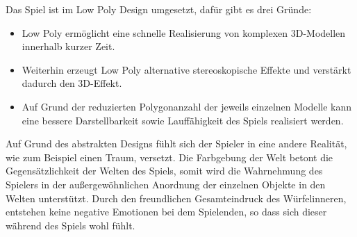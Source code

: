 
Das Spiel ist im Low Poly Design umgesetzt, dafür gibt es drei Gründe:
\begin{itemize}
\item Low Poly ermöglicht eine schnelle Realisierung von komplexen 3D-Modellen innerhalb kurzer Zeit.
\item Weiterhin erzeugt Low Poly alternative stereoskopische Effekte und verstärkt dadurch den 3D-Effekt.
\item Auf Grund der reduzierten Polygonanzahl der jeweils einzelnen Modelle kann eine bessere Darstellbarkeit sowie Lauffähigkeit des Spiels realisiert werden.
\end{itemize}

Auf Grund des abstrakten Designs fühlt sich der Spieler in eine andere Realität, wie zum Beispiel einen Traum, versetzt. Die Farbgebung der Welt betont die Gegensätzlichkeit der Welten des Spiels, somit wird die Wahrnehmung des Spielers in der außergewöhnlichen Anordnung der einzelnen Objekte in den Welten unterstützt. Durch den freundlichen Gesamteindruck des Würfelinneren, entstehen keine negative Emotionen bei dem Spielenden, so dass sich dieser während des Spiels wohl fühlt.
